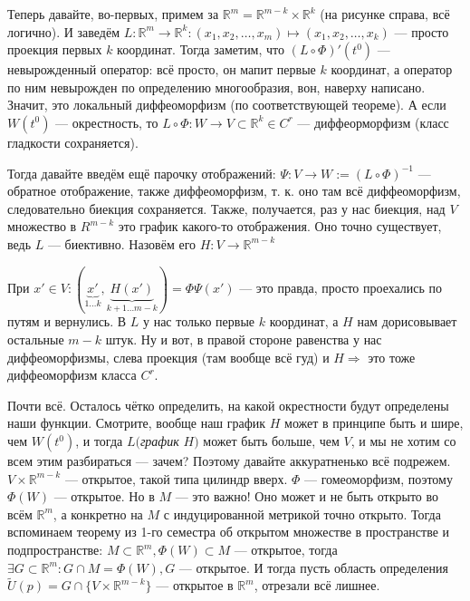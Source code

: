 \documentclass{article}
\begin{document}
Теперь давайте, во-первых, примем за $\mathbb{R}^m = \mathbb{R}^{m - k} \times \mathbb{R}^k$ (на рисунке справа, всё логично). И заведём $L: \mathbb{R}^m \rightarrow \mathbb{R}^k: (x_1, x_2, \ldots, x_m) \mapsto (x_1, x_2, \ldots, x_k)$ --- просто проекция первых $k$ координат. Тогда заметим, что $(L \circ \Phi)'(t^0)$ --- невырожденный оператор: всё просто, он мапит первые $k$ координат, а оператор по ним невырожден по определению многообразия, вон, наверху написано. Значит, это локальный диффеоморфизм (по соответствующей теореме). А если $W(t^0)$ --- окрестность, то $L \circ \Phi: W \rightarrow V \subset \mathbb{R}^k \in C^r$ --- диффеорморфизм (класс гладкости сохраняется).

Тогда давайте введём ещё парочку отображений: $\Psi: V \rightarrow W := (L \circ \Phi)^{-1}$ --- обратное отображение, также диффеоморфизм, т. к. оно там всё диффеоморфизм, следовательно биекция сохраняется. Также, получается, раз у нас биекция, над $V$ множество в $R^{m - k}$ это график какого-то отображения. Оно точно существует, ведь $L$ --- биективно. Назовём его $H: V \rightarrow \mathbb{R}^{m - k}$

При $x' \in V: (\underbrace{x'}_{1 \ldots k}, \underbrace{H(x')}_{k + 1 \ldots m - k}) = \Phi\Psi(x')$ --- это правда, просто проехались по путям и вернулись. В $L$ у нас только первые $k$ координат, а $H$ нам дорисовывает остальные $m - k$ штук. Ну и вот, в правой стороне равенства у нас диффеоморфизмы, слева проекция (там вообще всё гуд) и $H \Rightarrow$ это тоже диффеоморфизм класса $C^r$. 

Почти всё. Осталось чётко определить, на какой окрестности будут определены наши функции. Смотрите, вообще наш график $H$ может в принципе быть и шире, чем $W(t^0)$, и тогда $L($\textit{график} $H)$ может быть больше, чем $V$, и мы не хотим со всем этим разбираться --- зачем? Поэтому давайте аккуратненько всё подрежем. $V \times \mathbb{R}^{m - k}$ --- открытое, такой типа цилиндр вверх. $\Phi$ --- гомеоморфизм, поэтому $\Phi(W)$ --- открытое. Но в $M$ --- это важно! Оно может и не быть открыто во всём $\mathbb{R}^m$, а конкретно на $M$ с индуцированной метрикой точно открыто. Тогда вспоминаем теорему из 1-го семестра об открытом множестве в пространстве и подпространстве: $M \subset \mathbb{R}^m, \Phi(W) \subset M$ --- открытое, тогда $\exists G \subset \mathbb{R}^m: G \cap M = \Phi(W), G$ --- открытое. И тогда пусть область определения $\widetilde{U}(p) = G \cap \{V \times \mathbb{R}^{m - k}\}$ --- открытое в $\mathbb{R}^m$, отрезали всё лишнее. 
\end{document}
